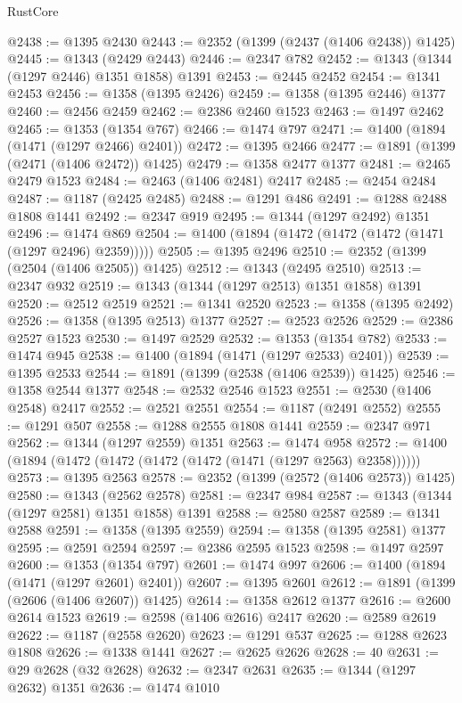 \begin{lexlean}{RustCore}
\begin{coremodule}
@2438 := @1395 @2430
@2443 := @2352 (@1399 (@2437 (@1406 @2438)) @1425)
@2445 := @1343 (@2429 @2443)
@2446 := @2347 @782
@2452 := @1343 (@1344 (@1297 @2446) @1351 @1858) @1391
@2453 := @2445 @2452
@2454 := @1341 @2453
@2456 := @1358 (@1395 @2426)
@2459 := @1358 (@1395 @2446) @1377
@2460 := @2456 @2459
@2462 := @2386 @2460 @1523
@2463 := @1497 @2462
@2465 := @1353 (@1354 @767)
@2466 := @1474 @797
@2471 := @1400 (@1894 (@1471 (@1297 @2466) @2401))
@2472 := @1395 @2466
@2477 := @1891 (@1399 (@2471 (@1406 @2472)) @1425)
@2479 := @1358 @2477 @1377
@2481 := @2465 @2479 @1523
@2484 := @2463 (@1406 @2481) @2417
@2485 := @2454 @2484
@2487 := @1187 (@2425 @2485)
@2488 := @1291 @486
@2491 := @1288 @2488 @1808 @1441
@2492 := @2347 @919
@2495 := @1344 (@1297 @2492) @1351
@2496 := @1474 @869
@2504 := @1400 (@1894 (@1472 (@1472 (@1472 (@1471 (@1297 @2496) @2359)))))
@2505 := @1395 @2496
@2510 := @2352 (@1399 (@2504 (@1406 @2505)) @1425)
@2512 := @1343 (@2495 @2510)
@2513 := @2347 @932
@2519 := @1343 (@1344 (@1297 @2513) @1351 @1858) @1391
@2520 := @2512 @2519
@2521 := @1341 @2520
@2523 := @1358 (@1395 @2492)
@2526 := @1358 (@1395 @2513) @1377
@2527 := @2523 @2526
@2529 := @2386 @2527 @1523
@2530 := @1497 @2529
@2532 := @1353 (@1354 @782)
@2533 := @1474 @945
@2538 := @1400 (@1894 (@1471 (@1297 @2533) @2401))
@2539 := @1395 @2533
@2544 := @1891 (@1399 (@2538 (@1406 @2539)) @1425)
@2546 := @1358 @2544 @1377
@2548 := @2532 @2546 @1523
@2551 := @2530 (@1406 @2548) @2417
@2552 := @2521 @2551
@2554 := @1187 (@2491 @2552)
@2555 := @1291 @507
@2558 := @1288 @2555 @1808 @1441
@2559 := @2347 @971
@2562 := @1344 (@1297 @2559) @1351
@2563 := @1474 @958
@2572 := @1400 (@1894 (@1472 (@1472 (@1472 (@1472 (@1471 (@1297 @2563) @2358))))))
@2573 := @1395 @2563
@2578 := @2352 (@1399 (@2572 (@1406 @2573)) @1425)
@2580 := @1343 (@2562 @2578)
@2581 := @2347 @984
@2587 := @1343 (@1344 (@1297 @2581) @1351 @1858) @1391
@2588 := @2580 @2587
@2589 := @1341 @2588
@2591 := @1358 (@1395 @2559)
@2594 := @1358 (@1395 @2581) @1377
@2595 := @2591 @2594
@2597 := @2386 @2595 @1523
@2598 := @1497 @2597
@2600 := @1353 (@1354 @797)
@2601 := @1474 @997
@2606 := @1400 (@1894 (@1471 (@1297 @2601) @2401))
@2607 := @1395 @2601
@2612 := @1891 (@1399 (@2606 (@1406 @2607)) @1425)
@2614 := @1358 @2612 @1377
@2616 := @2600 @2614 @1523
@2619 := @2598 (@1406 @2616) @2417
@2620 := @2589 @2619
@2622 := @1187 (@2558 @2620)
@2623 := @1291 @537
@2625 := @1288 @2623 @1808
@2626 := @1338 @1441
@2627 := @2625 @2626
@2628 := 40
@2631 := @29 @2628 (@32 @2628)
@2632 := @2347 @2631
@2635 := @1344 (@1297 @2632) @1351
@2636 := @1474 @1010

\end{coremodule}
\end{lexlean}
